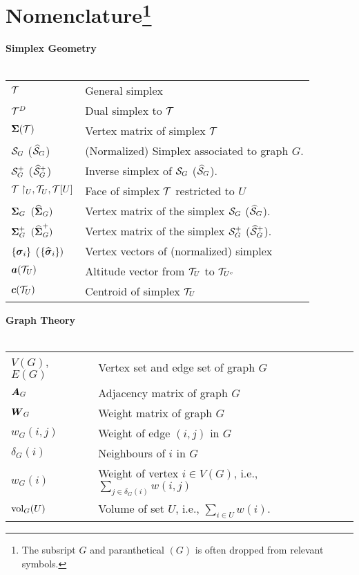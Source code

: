 \chapter*{Nomenclature\footnote{The subsript $G$ and paranthetical $(G)$ is often dropped from relevant symbols.}}

\newlength{\colwidth} %
\newlength{\groupsep} %
\newlength{\headingsep} %
\setlength{\colwidth}{3.5cm}
\setlength{\groupsep}{1cm}
\setlength{\headingsep}{0.05cm}

\textbf{Simplex Geometry}\\
\vspace{\headingsep}\\
\begin{tabular}{p{\colwidth}l}
	{$\mathcal{T}$} & {General simplex} \\
	$\mathcal{T}^D$ & Dual simplex to $\mathcal{T}$ \\
	$\boldsymbol{\Sigma}(\mathcal{T})$ & Vertex matrix of simplex $\mathcal{T}$ \\
	$\mathcal{S}_G$ ($\widehat{\mathcal{S}}_G$)  &  (Normalized) Simplex associated to graph $G$.\\
	$\mathcal{S}^+_G$ ($\widehat{\mathcal{S}}^+_G$)	& Inverse simplex of $\mathcal{S}_G$ ($\widehat{\mathcal{S}}_G$).\\
	{$\mathcal{T}\restriction_U, \mathcal{T}_U, \mathcal{T}[U]$} & {Face of simplex $\mathcal{T}$ restricted to $U$ }\\ 
	{$\boldsymbol{\Sigma}_G$ $(\widehat{\boldsymbol{\Sigma}}_G)$} & Vertex matrix of the simplex $\mathcal{S}_G$ ($\widehat{\mathcal{S}}_G$). \\
	{$\boldsymbol{\Sigma}_G^+$ $(\widehat{\boldsymbol{\Sigma}}_G^+)$} & Vertex matrix of the simplex $\mathcal{S}_G^+$ ($\widehat{\mathcal{S}}_G^+$). \\
	{$\{\vb*{\sigma}_i\}$ ($\{\widehat{\vb*{\sigma}}_i\})$} & {Vertex vectors of (normalized) simplex}\\
	{$\vb*{a}(\mathcal{T}_U)$} & {Altitude vector from $\mathcal{T}_U$ to $\mathcal{T}_{U^c}$}\\
	{$\vb*{c}(\mathcal{T}_U)$} & {Centroid of simplex $\mathcal{T}_U$}\\
\end{tabular}
\vspace{\groupsep}

\noindent \textbf{Graph Theory}\\
\vspace{\headingsep}\\
\begin{tabular}{p{\colwidth}l}
	$V(G)$, $E(G)$ & Vertex set and edge set of graph $G$\\
	$\vb*{A}_G$ & {Adjacency matrix of graph $G$}\\
	{$\vb*{W}_G$} & {Weight matrix of graph $G$}\\
	$w_G(i,j)$ & Weight of edge $(i,j)$ in $G$ \\
	$\delta_G(i)$ & Neighbours of $i$ in $G$ \\
	$w_G(i)$ & Weight of vertex $i\in V(G)$, i.e., $\sum_{j\in \delta_G(i)}w(i,j)$\\
	$\textnormal{vol}_G(U)$ & Volume of set $U$, i.e., $\sum_{i\in U}w(i)$. 
\end{tabular}
\vspace{\groupsep}



